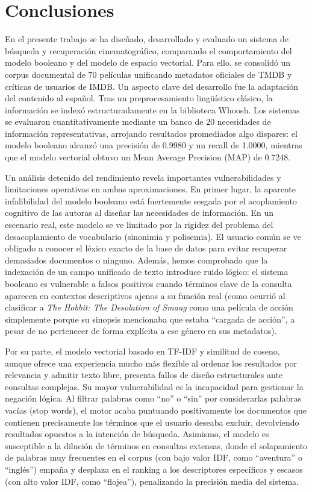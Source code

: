 \documentclass[conference,a4paper]{IEEEtran}
\begin{document}
\section{Conclusiones}

En el presente trabajo se ha diseñado, desarrollado y evaluado un sistema de búsqueda y recuperación cinematográfico, comparando el comportamiento del modelo booleano y del modelo de espacio vectorial. Para ello, se consolidó un corpus documental de 70 películas unificando metadatos oficiales de TMDB y críticas de usuarios de IMDB. Un aspecto clave del desarrollo fue la adaptación del contenido al español. Tras un preprocesamiento lingüístico clásico, la información se indexó estructuradamente en la biblioteca Whoosh. Los sistemas se evaluaron cuantitativamente mediante un banco de 20 necesidades de información representativas, arrojando resultados promediados algo dispares: el modelo booleano alcanzó una precisión de 0.9980 y un recall de 1.0000, mientras que el modelo vectorial obtuvo un Mean Average Precision (MAP) de 0.7248.

Un análisis detenido del rendimiento revela importantes vulnerabilidades y limitaciones operativas en ambas aproximaciones. En primer lugar, la aparente infalibilidad del modelo booleano está fuertemente sesgada por el acoplamiento cognitivo de las autoras al diseñar las necesidades de información. En un escenario real, este modelo se ve limitado por la rigidez del problema del desacoplamiento de vocabulario (sinonimia y polisemia). El usuario común se ve obligado a conocer el léxico exacto de la base de datos para evitar recuperar demasiados documentos o ninguno. Además, hemos comprobado que la indexación de un campo unificado de texto introduce ruido lógico: el sistema booleano es vulnerable a falsos positivos cuando términos clave de la consulta aparecen en contextos descriptivos ajenos a su función real (como ocurrió al clasificar a \textit{The Hobbit: The Desolation of Smaug} como una película de acción simplemente porque su sinopsis mencionaba que estaba ``cargada de acción'', a pesar de no pertenecer de forma explícita a ese género en sus metadatos).

Por su parte, el modelo vectorial basado en TF-IDF y similitud de coseno, aunque ofrece una experiencia mucho más flexible al ordenar los resultados por relevancia y admitir texto libre, presenta fallos de diseño estructurales ante consultas complejas. Su mayor vulnerabilidad es la incapacidad para gestionar la negación lógica. Al filtrar palabras como ``no'' o ``sin'' por considerarlas palabras vacías (stop words), el motor acaba puntuando positivamente los documentos que contienen precisamente los términos que el usuario deseaba excluir, devolviendo resultados opuestos a la intención de búsqueda. Asimismo, el modelo es susceptible a la dilución de términos en consultas extensas, donde el solapamiento de palabras muy frecuentes en el corpus (con bajo valor IDF, como ``aventura'' o ``inglés'') empaña y desplaza en el ranking a los descriptores específicos y escasos (con alto valor IDF, como ``flojea''), penalizando la precisión media del sistema.
\end{document}
